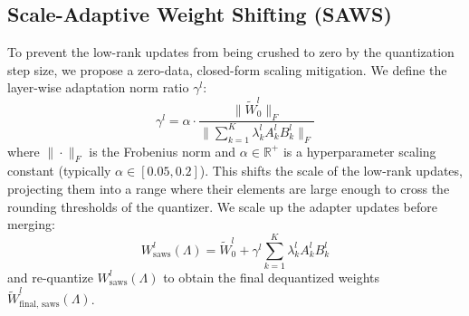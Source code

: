 \subsection{Scale-Adaptive Weight Shifting (SAWS)}
To prevent the low-rank updates from being crushed to zero by the quantization step size, we propose a zero-data, closed-form scaling mitigation. We define the layer-wise adaptation norm ratio $\gamma^l$:
\begin{equation}
  \gamma^l = \alpha \cdot \frac{\| \tilde{W}^l_0 \|_F}{\| \sum_{k=1}^K \lambda^l_k A^l_k B^l_k \|_F}
\end{equation}
where $\| \cdot \|_F$ is the Frobenius norm and $\alpha \in \mathbb{R}^+$ is a hyperparameter scaling constant (typically $\alpha \in [0.05, 0.2]$). This shifts the scale of the low-rank updates, projecting them into a range where their elements are large enough to cross the rounding thresholds of the quantizer.
We scale up the adapter updates before merging:
\begin{equation}
  W^l_{\text{saws}}(\Lambda) = \tilde{W}^l_0 + \gamma^l \sum_{k=1}^K \lambda^l_k A^l_k B^l_k
\end{equation}
and re-quantize $W^l_{\text{saws}}(\Lambda)$ to obtain the final dequantized weights $\tilde{W}^l_{\text{final, saws}}(\Lambda)$. 

